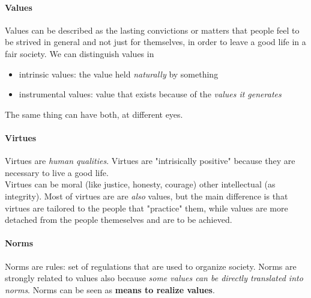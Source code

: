 \documentclass{article}
\begin{document}
			\paragraph{Values}
				Values can be described as the lasting convictions or matters that people feel to be strived in general and not just for themselves, in order to leave a good life in a fair society. We can distinguish values in
				\begin{itemize}
					\item intrinsic values: the value held \textit{naturally} by something
					\item instrumental values: value that exists because of the \textit{values it generates}
				\end{itemize}
				The same thing can have both, at different eyes.

			\paragraph{Virtues}
				Virtues are \textit{human qualities}. Virtues are "intrisically positive" because they are necessary to live a good life.\\
				Virtues can be moral (like justice, honesty, courage) other intellectual (as integrity). Most of virtues are are \textit{also} values, but the main difference is that virtues are tailored to the people that "practice" them, while values are more detached from the people themeselves and are to be achieved.

			\paragraph{Norms}
				Norms are rules: set of regulations that are used to organize society. Norms are strongly related to values also because \textit{some values can be directly translated into norms}. Norms can be seen as \textbf{means to realize values}.
\end{document}
